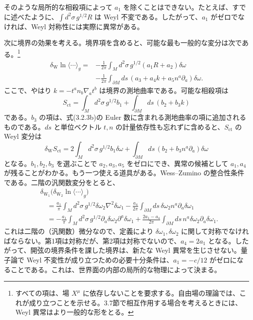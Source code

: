 そのような局所的な相殺項によって $a_1$ を除くことはできない。たとえば、すでに述べたように、$\int d^2\sigma\,g^{1/2}R$ は Weyl 不変である。したがって、$a_1$ がゼロでなければ、Weyl 対称性には実際に異常がある。

次に境界の効果を考える。境界項を含めると、可能な最も一般的な変分は次である。\footnote[3]{すべての項は、場 $X^\mu$ に依存しないことを要求する。自由場の理論では、これが成り立つことを示せる。3.7節で相互作用する場合を考えるときには、Weyl 異常はより一般的な形をとる。}
\begin{equation}
\begin{aligned}
\delta_{\mathrm W}\ln\langle\cdots\rangle_g
={}&-\frac1{2\pi}\int_Md^2\sigma\,g^{1/2}(a_1R+a_2)\delta\omega\\
&-\frac1{2\pi}\int_{\partial M}ds\,
(a_3+a_4k+a_5n^a\partial_a)\delta\omega.
\end{aligned}
\tag{3.4.27}\label{eq:3.4.27}
\end{equation}
ここで、やはり $k=-t^an_b\nabla_at^b$ は境界の測地曲率である。可能な相殺項は
\begin{equation}
S_{\mathrm{ct}}=\int_Md^2\sigma\,g^{1/2}b_1
+\int_{\partial M}ds\,(b_2+b_3k)
\tag{3.4.28}\label{eq:3.4.28}
\end{equation}
である。$b_3$ の項は、式(3.2.3b)の Euler 数に含まれる測地曲率の項に追加されるものである。$ds$ と単位ベクトル $t,n$ の計量依存性も忘れずに含めると、$S_{\mathrm{ct}}$ の Weyl 変分は
\begin{equation}
\delta_{\mathrm W}S_{\mathrm{ct}}
=2\int_Md^2\sigma\,g^{1/2}b_1\delta\omega
+\int_{\partial M}ds\,(b_2+b_3n^a\partial_a)\delta\omega
\tag{3.4.29}\label{eq:3.4.29}
\end{equation}
となる。$b_1,b_2,b_3$ を選ぶことで $a_2,a_3,a_5$ をゼロにでき、異常の候補として $a_1,a_4$ が残ることがわかる。もう一つ使える道具がある。Wess--Zumino の整合性条件である。二階の汎関数変分をとると、
\begin{equation}
\begin{aligned}
&\delta_{\mathrm W_1}\bigl(\delta_{\mathrm W_2}\ln\langle\cdots\rangle_g\bigr)\\
&\quad=\frac{a_1}{\pi}\int_Md^2\sigma\,g^{1/2}
\delta\omega_2\nabla^2\delta\omega_1
-\frac{a_4}{2\pi}\int_{\partial M}ds\,
\delta\omega_2n^a\partial_a\delta\omega_1\\
&\quad=-\frac{a_1}{\pi}\int_Md^2\sigma\,g^{1/2}
\partial_a\delta\omega_2\partial^a\delta\omega_1
+\frac{2a_1-a_4}{2\pi}\int_{\partial M}ds\,
n^a\delta\omega_2\partial_a\delta\omega_1.
\end{aligned}
\tag{3.4.30}\label{eq:3.4.30}
\end{equation}
これは二階の（汎関数）微分なので、定義により $\delta\omega_1,\delta\omega_2$ に関して対称でなければならない。第1項は対称だが、第2項は対称でないので、$a_4=2a_1$ となる。したがって、開弦の境界条件を課した境界は、新たな Weyl 異常を生じさせない。量子論で Weyl 不変性が成り立つための必要十分条件は、$a_1=-c/12$ がゼロになることである。これは、世界面の内部の局所的な物理によって決まる。


